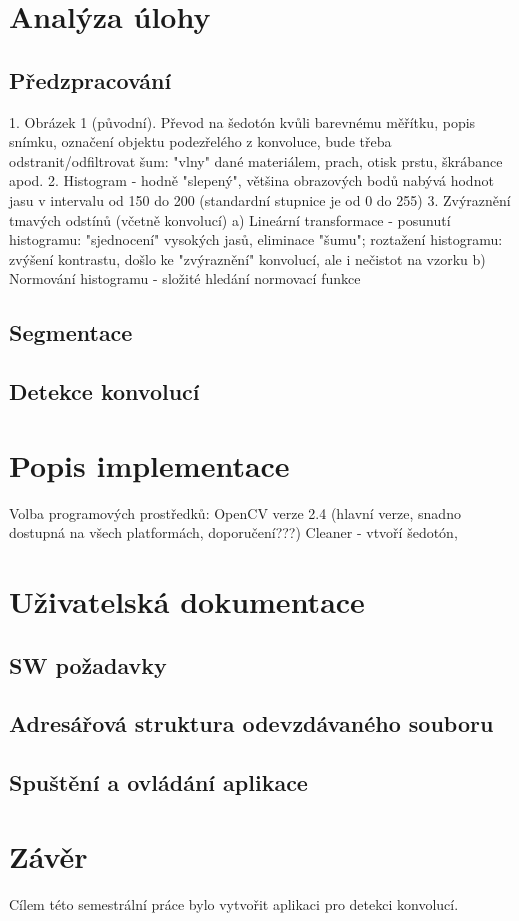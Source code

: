 \documentclass[12pt, a4paper]{report}
\begin{document}
\chapter{Analýza úlohy}
	\section{Předzpracování}
	1. Obrázek 1 (původní). Převod na šedotón kvůli barevnému měřítku, popis snímku, označení objektu podezřelého z konvoluce, bude třeba odstranit/odfiltrovat šum: "vlny" dané materiálem, prach, otisk prstu, škrábance apod.
	2. Histogram - hodně "slepený", většina obrazových bodů nabývá hodnot jasu v intervalu od 150 do 200 (standardní stupnice je od 0 do 255)
	3.	Zvýraznění tmavých odstínů (včetně konvolucí) 
		a) Lineární transformace - posunutí histogramu: "sjednocení" vysokých jasů, eliminace "šumu"; roztažení histogramu: zvýšení kontrastu, došlo ke "zvýraznění" konvolucí, ale i nečistot na vzorku 
		b) Normování histogramu - složité hledání normovací funkce
	\section{Segmentace}
	\section{Detekce konvolucí}


\chapter{Popis implementace}
Volba programových prostředků: OpenCV verze 2.4 (hlavní verze, snadno dostupná na všech platformách, doporučení???)
	Cleaner - vtvoří šedotón, 

\chapter{Uživatelská dokumentace}
	\section{SW požadavky}
	
	\section{Adresářová struktura odevzdávaného souboru}	
	
	\section{Spuštění a ovládání aplikace}	

\chapter{Závěr}
Cílem této semestrální práce bylo vytvořit aplikaci pro detekci konvolucí.
\end{document}
